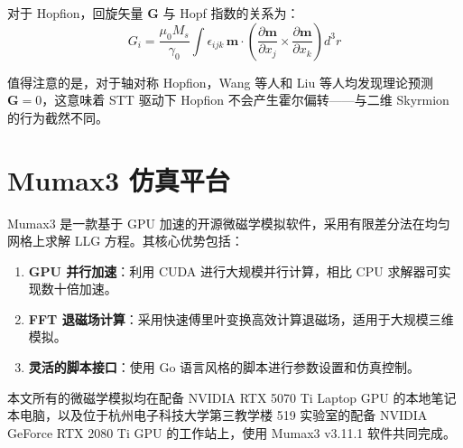 对于 Hopfion，回旋矢量 $\mathbf{G}$ 与 Hopf 指数的关系为\cite{liu2020three}：
\begin{equation}
  G_i = \frac{\mu_0 M_s}{\gamma_0} \int \epsilon_{ijk} \, \mathbf{m} \cdot \left( \frac{\partial \mathbf{m}}{\partial x_j} \times \frac{\partial \mathbf{m}}{\partial x_k} \right) d^3r
  \label{eq:gyrovector}
\end{equation}

值得注意的是，对于轴对称 Hopfion，Wang 等人\cite{wang2019current}和 Liu 等人\cite{liu2020three}均发现理论预测 $\mathbf{G} = 0$，这意味着 STT 驱动下 Hopfion 不会产生霍尔偏转——与二维 Skyrmion 的行为截然不同。


\section{Mumax3 仿真平台}

Mumax3 是一款基于 GPU 加速的开源微磁学模拟软件，采用有限差分法在均匀网格上求解 LLG 方程\cite{vansteenkiste2014design}。其核心优势包括：

\begin{enumerate}[label=(\arabic*)]
  \item \textbf{GPU 并行加速}：利用 CUDA 进行大规模并行计算，相比 CPU 求解器可实现数十倍加速。
  \item \textbf{FFT 退磁场计算}：采用快速傅里叶变换高效计算退磁场，适用于大规模三维模拟。
  \item \textbf{灵活的脚本接口}：使用 Go 语言风格的脚本进行参数设置和仿真控制。
\end{enumerate}

本文所有的微磁学模拟均在配备 NVIDIA RTX 5070 Ti Laptop GPU 的本地笔记本电脑，以及位于杭州电子科技大学第三教学楼 519 实验室的配备 NVIDIA GeForce RTX 2080 Ti GPU 的工作站上，使用 Mumax3 v3.11.1 软件共同完成。
